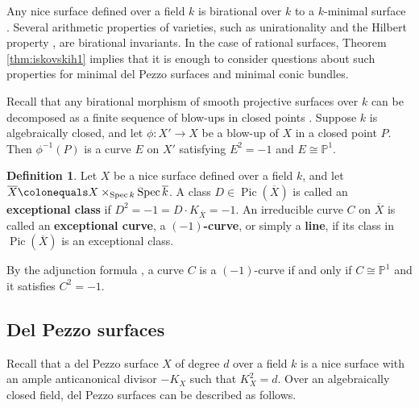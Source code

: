 \documentclass[a4paper, 11pt, reqno]{amsart}
\numberwithin{equation}{section} \numberwithin{figure}{section}
\newcommand{\term}[1]{\textbf{#1}}          %
\DeclareMathOperator{\Pic}{Pic}
\DeclareMathOperator{\Spec}{Spec}
\def \P {{\mathbb P}}
\newcommand{\ra}{\rightarrow}
\theoremstyle{definition}
\newtheorem{definition}[lemma]{Definition}
\numberwithin{lemma}{section}
\begin{document}
Any nice surface defined over a field $k$ is birational over $k$ to a $k$-minimal surface \cite[Proposition II.16]{beauville}. Several arithmetic properties of varieties, such as unirationality and the Hilbert property \cite[Section 3.1]{SerreTopics}, are birational invariants. In the case of rational surfaces, Theorem \ref{thm:iskovskih1} implies that it is enough to consider questions about such properties for minimal del Pezzo surfaces and minimal conic bundles.

Recall that any birational morphism of smooth projective surfaces over $k$ can be decomposed as a finite sequence of blow-ups in closed points \cite[Theorem 21.4]{manin}. Suppose $k$ is algebraically closed, and let $\phi \colon X' \ra X$ be a blow-up of $X$ in a closed point $P$. Then $\phi^{-1}(P)$ is a curve $E$ on $X'$ satisfying $E^2 = -1$ and $E \cong \P^1$.

\begin{definition}
    Let $X$ be a nice surface defined over a field $k$, and let $\overline{X} \colonequals X \times_{\Spec k} \Spec \overline{k}$. A class $D \in \Pic(\overline{X})$ is called an \term{exceptional class} if $D^2 = -1 = D \cdot K_{\overline{X}} = -1$. An irreducible curve $C$ on $\overline{X}$ is called an \term{exceptional curve}, a \term{$(-1)$-curve}, or simply a \term{line}, if its class in $\Pic(\overline{X})$ is an exceptional class.
\end{definition}

By the adjunction formula \cite[V, Exercise 1.3]{hartshorne}, a curve $C$ is a $(-1)$-curve if and only if $C \cong \P^1$ and it satisfies $C^2 = -1$.

\subsection{Del Pezzo surfaces}\label{sec:delPezzosurfaces}
Recall that a del Pezzo surface $X$ of degree $d$ over a field $k$ is a nice surface with an ample anticanonical divisor $-K_X$ such that $K_X^2 = d$. Over an algebraically closed field, del Pezzo surfaces can be described as follows.
\end{document}
